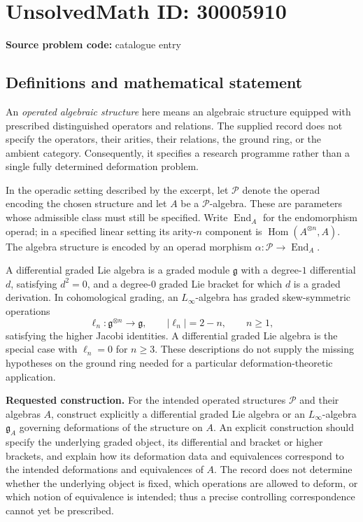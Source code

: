 \documentclass[11pt]{article}
\begin{document}
\section*{UnsolvedMath ID: 30005910}
\textbf{Source problem code:} catalogue entry
\subsection{Definitions and mathematical statement}
An \emph{operated algebraic structure} here means an algebraic structure equipped with prescribed distinguished operators and relations. The supplied record does not specify the operators, their arities, their relations, the ground ring, or the ambient category. Consequently, it specifies a research programme rather than a single fully determined deformation problem.

In the operadic setting described by the excerpt, let \(\mathcal P\) denote the operad encoding the chosen structure and let \(A\) be a \(\mathcal P\)-algebra. These are parameters whose admissible class must still be specified. Write \(\operatorname{End}_A\) for the endomorphism operad; in a specified linear setting its arity-\(n\) component is \(\operatorname{Hom}(A^{\otimes n},A)\). The algebra structure is encoded by an operad morphism \(\alpha\colon\mathcal P\to\operatorname{End}_A\).

A differential graded Lie algebra is a graded module \(\mathfrak g\) with a degree-\(1\) differential \(d\), satisfying \(d^2=0\), and a degree-\(0\) graded Lie bracket for which \(d\) is a graded derivation. In cohomological grading, an \(L_\infty\)-algebra has graded skew-symmetric operations
\[
\ell_n\colon\mathfrak g^{\otimes n}\longrightarrow\mathfrak g,
\qquad |\ell_n|=2-n,\qquad n\geq 1,
\]
satisfying the higher Jacobi identities. A differential graded Lie algebra is the special case with \(\ell_n=0\) for \(n\geq3\). These descriptions do not supply the missing hypotheses on the ground ring needed for a particular deformation-theoretic application.

\textbf{Requested construction.} For the intended operated structures \(\mathcal P\) and their algebras \(A\), construct explicitly a differential graded Lie algebra or an \(L_\infty\)-algebra \(\mathfrak g_A\) governing deformations of the structure on \(A\). An explicit construction should specify the underlying graded object, its differential and bracket or higher brackets, and explain how its deformation data and equivalences correspond to the intended deformations and equivalences of \(A\). The record does not determine whether the underlying object is fixed, which operations are allowed to deform, or which notion of equivalence is intended; thus a precise controlling correspondence cannot yet be prescribed.
\end{document}
